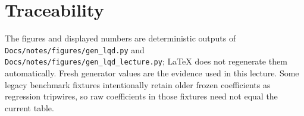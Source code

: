 \documentclass[11pt]{article}
\begin{document}
\section{Traceability}
\label{sec:traceability}

The figures and displayed numbers are deterministic outputs of
\texttt{Docs/notes/figures/gen\_lqd.py} and
\texttt{Docs/notes/figures/gen\_lqd\_lecture.py}; LaTeX does not regenerate
them automatically.  Fresh generator values are the evidence used in this
lecture.  Some legacy benchmark fixtures intentionally retain older frozen
coefficients as regression tripwires, so raw coefficients in those fixtures
need not equal the current table.

\begingroup
\small
\setlength{\tabcolsep}{4pt}
\renewcommand{\arraystretch}{1.15}
\end{document}
